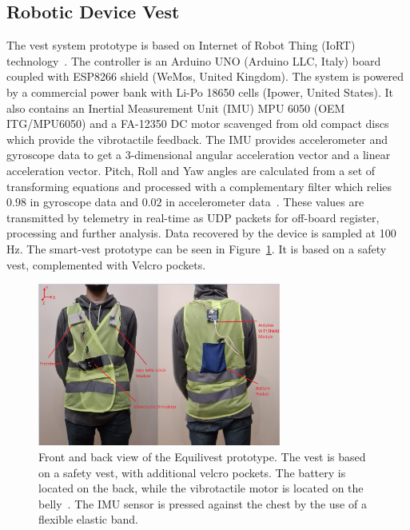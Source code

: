 \documentclass[conference]{IEEEtran}
\begin{document}

%

\subsection{Robotic Device Vest}
\label{sec:vest}

The vest system prototype is based on Internet of Robot Thing (IoRT) technology~\cite{Simoens.etal2018,Domingo.etal2012}. The controller is an Arduino UNO (Arduino LLC, Italy) board coupled with ESP8266 shield (WeMos, United Kingdom).  The system is powered by a commercial power bank with Li-Po 18650 cells (Ipower, United States). It also contains an Inertial Measurement Unit (IMU) MPU 6050 (OEM ITG/MPU6050) and a FA-12350 DC motor scavenged from old compact discs which provide the vibrotactile feedback.  The IMU provides accelerometer and gyroscope data to get a 3-dimensional angular acceleration vector and a linear acceleration vector. Pitch, Roll and Yaw angles are calculated from a set of transforming equations and processed with a complementary filter which relies $0.98$ in gyroscope data and $0.02$ in accelerometer data~\cite{Fetick.2022}. These values are transmitted by telemetry in real-time as UDP packets for off-board register, processing and further analysis. Data recovered by the device is sampled at 100 Hz. The smart-vest prototype can be seen in Figure~\ref{fig:smart-vest}.  It is based on a safety vest, complemented with Velcro pockets. 

\begin{figure}[h!]
\centering
\includegraphics[width=8cm]{equilivest.png}
\caption{Front and back view of the Equilivest prototype.  The vest is based on a safety vest, with additional velcro pockets.  The battery is located on the back, while the vibrotactile motor is located on the belly~\cite{Brandebusemeyer.etal2021}.  The IMU sensor is pressed against the chest by the use of a flexible elastic band. }
\label{fig:smart-vest}
\end{figure}
\end{document}
